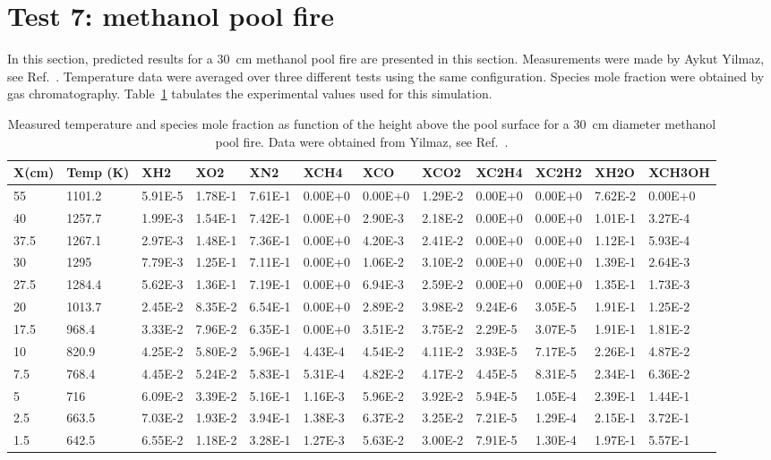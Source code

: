 \section{Test 7: methanol pool fire}

In this section, predicted results for a 30~cm methanol pool fire are presented in this section. Measurements were made by Aykut Yilmaz, see Ref.~\cite{Yilmaz2008}. Temperature data were averaged over three different tests using the same configuration. Species mole fraction were obtained by gas chromatography. Table~\ref{table::test7_methanol} tabulates the experimental values used for this simulation.
\begin{table}[ht]
\centering
\caption{Measured temperature and species mole fraction as function of the height above the pool surface for a 30~cm diameter methanol pool fire. Data were obtained from Yilmaz, see Ref.~\cite{Yilmaz2008}.\label{table::test7_methanol}}
    \tiny
\begin{tabular}{llllllllllll}
\hline
X(cm) & Temp (K) & XH2 & XO2 & XN2 & XCH4 & XCO & XCO2 & XC2H4 & XC2H2 & XH2O & XCH3OH\\
\hline
55 & 1101.2 & 5.91E-5 & 1.78E-1 & 7.61E-1 & 0.00E+0 & 0.00E+0 & 1.29E-2 & 0.00E+0 & 0.00E+0 & 7.62E-2 & 0.00E+0\\
40 & 1257.7 & 1.99E-3 & 1.54E-1 & 7.42E-1 & 0.00E+0 & 2.90E-3 & 2.18E-2 & 0.00E+0 & 0.00E+0 & 1.01E-1 & 3.27E-4\\
37.5 & 1267.1 & 2.97E-3 & 1.48E-1 & 7.36E-1 & 0.00E+0 & 4.20E-3 & 2.41E-2 & 0.00E+0 & 0.00E+0 & 1.12E-1 & 5.93E-4\\
30 & 1295 & 7.79E-3 & 1.25E-1 & 7.11E-1 & 0.00E+0 & 1.06E-2 & 3.10E-2 & 0.00E+0 & 0.00E+0 & 1.39E-1 & 2.64E-3\\
27.5 & 1284.4 & 5.62E-3 & 1.36E-1 & 7.19E-1 & 0.00E+0 & 6.94E-3 & 2.59E-2 & 0.00E+0 & 0.00E+0 & 1.35E-1 & 1.73E-3\\
20 & 1013.7 & 2.45E-2 & 8.35E-2 & 6.54E-1 & 0.00E+0 & 2.89E-2 & 3.98E-2 & 9.24E-6 & 3.05E-5 & 1.91E-1 & 1.25E-2\\
17.5 & 968.4 & 3.33E-2 & 7.96E-2 & 6.35E-1 & 0.00E+0 & 3.51E-2 & 3.75E-2 & 2.29E-5 & 3.07E-5 & 1.91E-1 & 1.81E-2\\
10 & 820.9 & 4.25E-2 & 5.80E-2 & 5.96E-1 & 4.43E-4 & 4.54E-2 & 4.11E-2 & 3.93E-5 & 7.17E-5 & 2.26E-1 & 4.87E-2\\
7.5 & 768.4 & 4.45E-2 & 5.24E-2 & 5.83E-1 & 5.31E-4 & 4.82E-2 & 4.17E-2 & 4.45E-5 & 8.31E-5 & 2.34E-1 & 6.36E-2\\
5 & 716 & 6.09E-2 & 3.39E-2 & 5.16E-1 & 1.16E-3 & 5.96E-2 & 3.92E-2 & 5.94E-5 & 1.05E-4 & 2.39E-1 & 1.44E-1\\
2.5 & 663.5 & 7.03E-2 & 1.93E-2 & 3.94E-1 & 1.38E-3 & 6.37E-2 & 3.25E-2 & 7.21E-5 & 1.29E-4 & 2.15E-1 & 3.72E-1\\
1.5 & 642.5 & 6.55E-2 & 1.18E-2 & 3.28E-1 & 1.27E-3 & 5.63E-2 & 3.00E-2 & 7.91E-5 & 1.30E-4 & 1.97E-1 & 5.57E-1\\
\hline
\end{tabular}
 \end{table}


